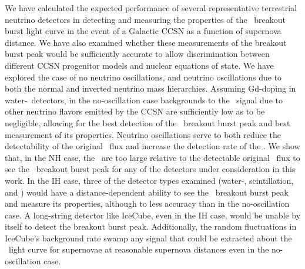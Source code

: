We have calculated the expected performance of several representative
terrestrial neutrino detectors in detecting and measuring the
properties of the \nue\ breakout burst light curve in the event of a Galactic
CCSN as a function of supernova distance. We have also examined
whether these measurements of the breakout burst peak would be
sufficiently accurate to allow discrimination between different CCSN
progenitor models and nuclear equations of state.  We have explored the case
of no neutrino oscillations, and neutrino oscillations due to
both the normal and inverted neutrino mass hierarchies.  Assuming
Gd-doping in water-\cer\ detectors, in the no-oscillation case
 backgrounds to the \nue\ signal 
due to other neutrino flavors emitted by the CCSN
are sufficiently low as to be negligible, allowing for the best
detection of the \nue\ breakout burst peak and best measurement of its
properties. Neutrino oscillations serve to both reduce the
detectability of the original \nue\ flux and increase the
detection rate of the \background.  We show that, in the NH
case, the \backgrounds\ are too large relative to the detectable original
\nue\ flux to see the \nue\ breakout burst peak for any of the
detectors under consideration in this work.  In the IH case,
three of
the detector types examined (water-\cer, scintillation, and
) would have a distance-dependent ability to see the
\nue\ breakout burst peak and measure its properties, although to less
accuracy than in the no-oscillation case.  
A long-string detector like IceCube, even in the IH case, would be unable by itself to
    detect the breakout burst peak.  Additionally, the random fluctuations in
    IceCube's background rate swamp any signal that could be extracted about the 
    \nue\ light curve for supernovae at reasonable supernova distances even in 
    the no-oscillation case.


